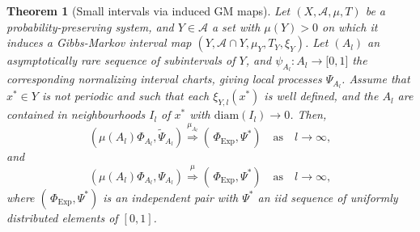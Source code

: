 \documentclass[10pt]{amsart}
\newtheorem{theo}{Theorem}[section]
\theoremstyle{definition}\newtheorem{defi}[theo]{Definition}\newtheorem{rema}[theo]{Remark}\newtheorem{exam}[theo]{Example}\newtheorem{exem}[theo]{Example}\newtheorem{nota}[theo]{Notation}
\newcommand{\clA}{\mathcal{A}}
\newcommand{\Expl}{\mathrm{Exp}}
\newcommand{\diam}{\mathrm{diam}}
\begin{document}
\begin{theo}[{Small intervals via induced GM maps}]\label{T_SpatioTempIntervalMapsInducing}
Let $(X,\clA,\mu,T)$ be a probability-preserving system, and $Y\in\clA$ a set with $\mu(Y)>0$ on which it induces a Gibbs-Markov interval map $(Y,\clA\cap Y,\mu _{Y},T_{Y},\xi_{Y})$. Let $(A_{l})$ an asymptotically rare sequence of subintervals of $Y$, and $\psi_{A_{l}}:A_{l}\rightarrow\lbrack0,1]$ the corresponding normalizing interval charts, giving local processes $\Psi _{A_{l}}$. Assume that $x^{\ast}\in Y$ is not periodic and such that each $\xi_{Y,l}(x^{\ast})$ is well defined, and the $A_{l}$ are contained in neighbourhoods $I_{l}$ of $x^{\ast}$ with $\diam(I_{l})\rightarrow0 $. Then,
\begin{equation}\label{Eq_slslslslsslsl}
\left(\mu(A_{l})\Phi_{A_{l}},\widetilde{\Psi}_{A_{l}}\right)\overset{\mu_{A_{l}}}{\Longrightarrow}\left(\,\Phi_{\Expl},\Psi^{\ast}\right)\quad\text{as}\quad l\rightarrow\infty, 
\end{equation}
and
\begin{equation}\label{Eq_jhbvfjhfedbvhdfabvjhadvahg}
\left(\mu(A_{l})\Phi_{A_{l}},\Psi_{A_{l}}\right)\overset{\mu}{\Longrightarrow} \left(\,\Phi_{\Expl},\Psi^{\ast}\right)\quad\text{as}\quad l\rightarrow\infty,
\end{equation}
where $(\,\Phi_{\Expl},\Psi^{\ast})$ is an independent pair with $\Psi^{\ast}$ an iid sequence of uniformly distributed elements of $[0,1]$.
\end{theo}
\end{document}
